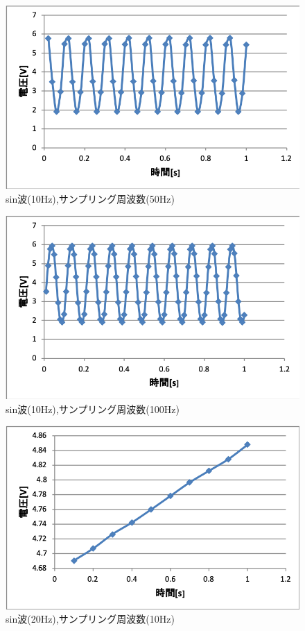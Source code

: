 \documentclass[11pt, a4paper,twocolumn]{jarticle}
\begin{document}
\begin{figure}[htbp]
 \begin{center}
  \includegraphics[width=0.8\linewidth]{fig5.png}
 \end{center}
 \caption{sin波(10Hz),サンプリング周波数(50Hz)}
 \label{fig:5}
\end{figure}

\begin{figure}[htbp]
 \begin{center}
  \includegraphics[width=0.8\linewidth]{fig6.png}
 \end{center}
 \caption{sin波(10Hz),サンプリング周波数(100Hz)}
 \label{fig:6}
\end{figure}

\begin{figure}[htbp]
 \begin{center}
  \includegraphics[width=0.8\linewidth]{fig7.png}
 \end{center}
 \caption{sin波(20Hz),サンプリング周波数(10Hz)}
 \label{fig:7}
\end{figure}
\end{document}
